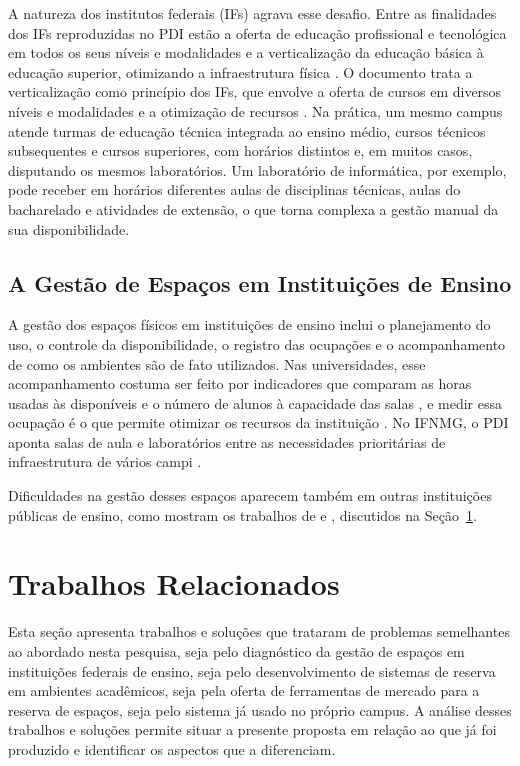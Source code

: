 A natureza dos institutos federais (IFs) agrava esse desafio. Entre as finalidades dos IFs reproduzidas no PDI estão a oferta de educação profissional e tecnológica em todos os seus níveis e modalidades e a verticalização da educação básica à educação superior, otimizando a infraestrutura física \cite[p.~10--11]{ifnmg2024pdi}. O documento trata a verticalização como princípio dos IFs, que envolve a oferta de cursos em diversos níveis e modalidades e a otimização de recursos \cite[p.~72]{ifnmg2024pdi}. Na prática, um mesmo campus atende turmas de educação técnica integrada ao ensino médio, cursos técnicos subsequentes e cursos superiores, com horários distintos e, em muitos casos, disputando os mesmos laboratórios. Um laboratório de informática, por exemplo, pode receber em horários diferentes aulas de disciplinas técnicas, aulas do bacharelado e atividades de extensão, o que torna complexa a gestão manual da sua disponibilidade.

\subsection{A Gestão de Espaços em Instituições de Ensino}
\label{sec:gestao}

A gestão dos espaços físicos em instituições de ensino inclui o planejamento do uso, o controle da disponibilidade, o registro das ocupações e o acompanhamento de como os ambientes são de fato utilizados. Nas universidades, esse acompanhamento costuma ser feito por indicadores que comparam as horas usadas às disponíveis e o número de alunos à capacidade das salas \cite[p.~17]{oliveira2020medicao}, e medir essa ocupação é o que permite otimizar os recursos da instituição \cite[p.~20]{oliveira2020medicao}. No IFNMG, o PDI aponta salas de aula e laboratórios entre as necessidades prioritárias de infraestrutura de vários campi \cite[p.~181]{ifnmg2024pdi}.

Dificuldades na gestão desses espaços aparecem também em outras instituições públicas de ensino, como mostram os trabalhos de  e , discutidos na Seção~\ref{sec:trabrel}.

\section{Trabalhos Relacionados}
\label{sec:trabrel}

Esta seção apresenta trabalhos e soluções que trataram de problemas semelhantes ao abordado nesta pesquisa, seja pelo diagnóstico da gestão de espaços em instituições federais de ensino, seja pelo desenvolvimento de sistemas de reserva em ambientes acadêmicos, seja pela oferta de ferramentas de mercado para a reserva de espaços, seja pelo sistema já usado no próprio campus. A análise desses trabalhos e soluções permite situar a presente proposta em relação ao que já foi produzido e identificar os aspectos que a diferenciam.

